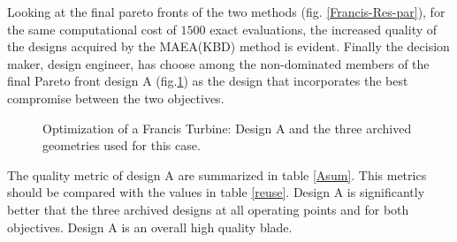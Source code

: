 Looking at the final pareto fronts of the two methods (fig. \ref{Francis-Res-par}), for the same computational cost of $1500$ exact evaluations, the increased quality of the designs acquired by the MAEA(KBD) method is evident. Finally the decision maker, design engineer, has choose among the non-dominated members of the final Pareto front design A (fig.\ref{design-bases-a}) as the design that incorporates the best compromise between the two objectives.


\begin{figure}[h!]
\begin{minipage}[b]{1\linewidth}
 \centering
\end{minipage}
\caption{Optimization of a Francis Turbine: Design A and the three archived geometries used for this case.}
\label{design-bases-a}
\end{figure}

The quality metric of design A are summarized in table \ref{Asum}. This metrics should be compared with the values in table \ref{reuse}. Design A is significantly better that the three archived designs at all operating points and for both objectives. Design A is an overall high quality blade.


